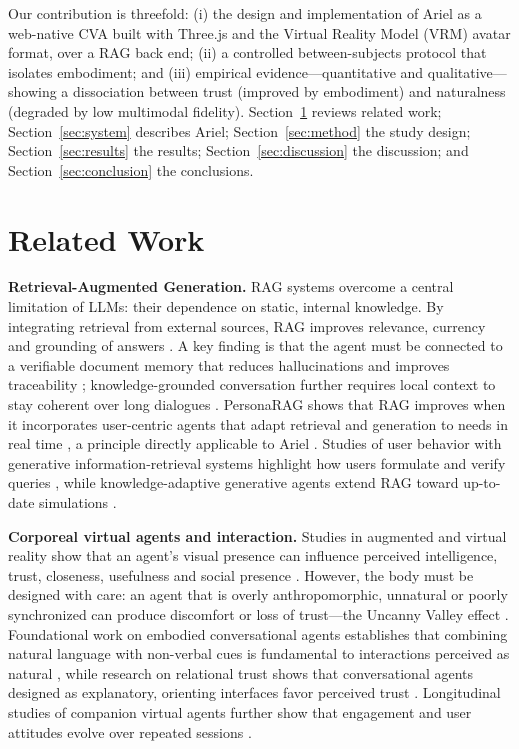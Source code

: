 \documentclass[conference]{IEEEtran}
\begin{document}
Our contribution is threefold: (i) the design and implementation of Ariel as a
web-native CVA built with Three.js and the Virtual Reality Model (VRM) avatar
format, over a RAG back end; (ii) a controlled
between-subjects protocol that isolates embodiment; and (iii) empirical
evidence---quantitative and qualitative---showing a dissociation between trust
(improved by embodiment) and naturalness (degraded by low multimodal fidelity).
Section~\ref{sec:related} reviews related work; Section~\ref{sec:system}
describes Ariel; Section~\ref{sec:method} the study design;
Section~\ref{sec:results} the results; Section~\ref{sec:discussion} the
discussion; and Section~\ref{sec:conclusion} the conclusions.


\section{Related Work}
\label{sec:related}

\textbf{Retrieval-Augmented Generation.}
RAG systems overcome a central limitation of LLMs: their dependence on static,
internal knowledge. By integrating retrieval from external sources, RAG improves
relevance, currency and grounding of answers \cite{fan2024,roy2024,haque2025,
ahn2022}. A key finding is that the agent must be connected to a verifiable
document memory that reduces hallucinations and improves traceability
\cite{fan2024,roy2024}; knowledge-grounded conversation further requires local
context to stay coherent over long dialogues \cite{ahn2022}. PersonaRAG shows
that RAG improves when it incorporates user-centric agents that adapt retrieval
and generation to needs in real time \cite{zerhoudi2024}, a principle directly
applicable to Ariel \cite{more2025,schmitt2022}. Studies of user behavior with
generative information-retrieval systems highlight how users formulate and
verify queries \cite{liang2025}, while knowledge-adaptive generative agents
extend RAG toward up-to-date simulations \cite{shimadzu2025}.

\textbf{Corporeal virtual agents and interaction.}
Studies in augmented and virtual reality show that an agent's visual presence
can influence perceived intelligence, trust, closeness, usefulness and social
presence \cite{wang2019,chang2022,yang2025ar,zhu2024,koleva2024}. However, the
body must be designed with care: an agent that is overly anthropomorphic,
unnatural or poorly synchronized can produce discomfort or loss of trust---the
Uncanny Valley effect \cite{mori2012,wang2019}. Foundational work on embodied
conversational agents establishes that combining natural language with
non-verbal cues is fundamental to interactions perceived as natural
\cite{alalyani2023}, while research on relational trust shows that conversational
agents designed as explanatory, orienting interfaces favor perceived trust
\cite{schmitt2022}. Longitudinal studies of companion virtual agents further
show that engagement and user attitudes evolve over repeated sessions
\cite{calvo2025}.
\end{document}
